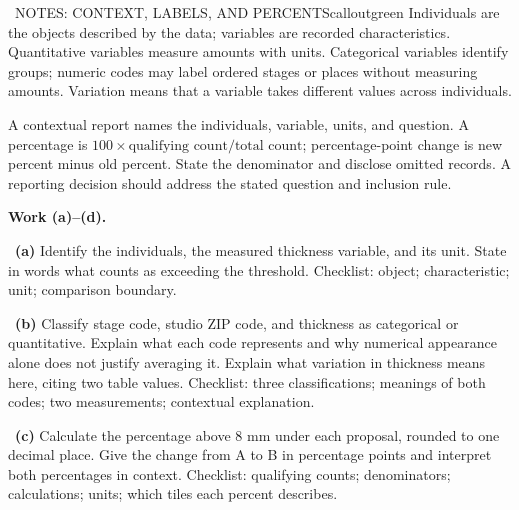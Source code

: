 \documentclass[11pt]{article}
\begin{document}
\begin{callout}{\IconBook\ NOTES: CONTEXT, LABELS, AND PERCENTS}{calloutgreen}
Individuals are the objects described by the data; variables are recorded characteristics. Quantitative variables measure amounts with units. Categorical variables identify groups; numeric codes may label ordered stages or places without measuring amounts. Variation means that a variable takes different values across individuals.\par A contextual report names the individuals, variable, units, and question. A percentage is $100\times\text{qualifying count}/\text{total count}$; percentage-point change is new percent minus old percent. State the denominator and disclose omitted records. A reporting decision should address the stated question and inclusion rule.
\end{callout}

\newpage
\setlength{\parskip}{4pt}
\textbf{Work (a)--(d).}\par\smallskip

~\textbf{(a)} Identify the individuals, the measured thickness variable, and its unit. State in words what counts as exceeding the threshold. Checklist: object; characteristic; unit; comparison boundary.\par
{}

~\textbf{(b)} Classify stage code, studio ZIP code, and thickness as categorical or quantitative. Explain what each code represents and why numerical appearance alone does not justify averaging it. Explain what variation in thickness means here, citing two table values. Checklist: three classifications; meanings of both codes; two measurements; contextual explanation.\par
{}

~\textbf{(c)} Calculate the percentage above 8 mm under each proposal, rounded to one decimal place. Give the change from A to B in percentage points and interpret both percentages in context. Checklist: qualifying counts; denominators; calculations; units; which tiles each percent describes.\par
{}
\end{document}
